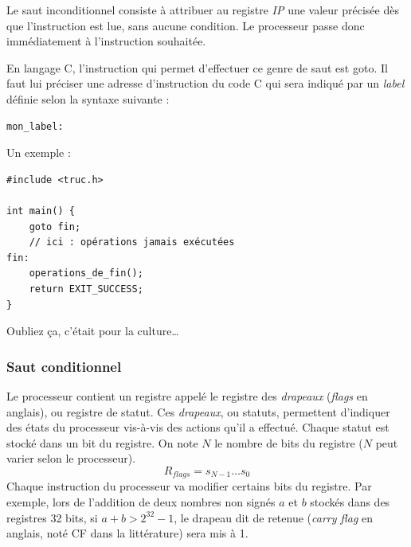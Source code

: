 \documentclass[../../../main.tex]{subfiles}
\begin{document}
Le saut inconditionnel consiste à attribuer au registre \textit{IP} une valeur précisée dès que l'instruction est lue, sans aucune condition. Le processeur passe donc immédiatement à l'instruction souhaitée.
 
En langage C, l'instruction qui permet d'effectuer ce genre de saut est \textsf{goto}. Il faut lui préciser une adresse d'instruction du code C qui sera indiqué par un \textit{label} définie selon la syntaxe suivante :
\begin{verbatim}
mon_label:
\end{verbatim}
Un exemple :
\begin{verbatim}
#include <truc.h>

int main() {
	goto fin;
	// ici : opérations jamais exécutées
fin:
	operations_de_fin();
	return EXIT_SUCCESS;
}
\end{verbatim}
Oubliez ça, c'était pour la culture\dots
 
\subsubsection{Saut conditionnel}
 
Le processeur contient un registre appelé le registre des \textit{drapeaux} (\textit{flags} en anglais), ou registre de statut. Ces \textit{drapeaux}, ou statuts, permettent d'indiquer des états du processeur vis-à-vis des actions qu'il a effectué. Chaque statut est stocké dans un bit du registre. On note $N$ le nombre de bits du registre ($N$ peut varier selon le processeur).
$$R_{flags} = s_{N-1}\dots s_{0}$$
Chaque instruction du processeur va modifier certains bits du registre. Par exemple, lors de l'addition de deux nombres non signés $a$ et $b$ stockés dans des registres 32 bits, si $a + b > 2^{32} - 1$, le drapeau dit de retenue (\textit{carry flag} en anglais, noté CF dans la littérature) sera mis à 1.
 
\end{document}
